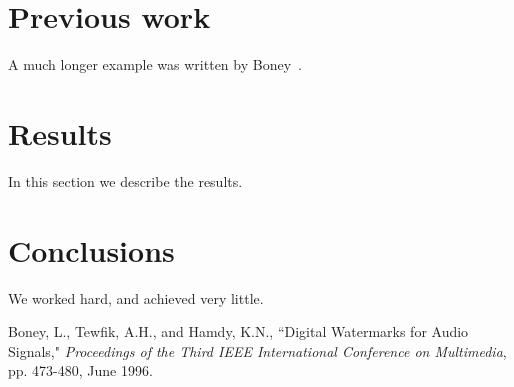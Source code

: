 \documentclass[11pt]{article}
\begin{document}
\section{Previous work}\label{previous work}
A much longer \LaTeXe{} example was written by Boney~\cite{Boney96}.

\section{Results}\label{results}
In this section we describe the results.

\section{Conclusions}\label{conclusions}
We worked hard, and achieved very little.

\begin{thebibliography}{100}

 Boney, L., Tewfik, A.H., and Hamdy, K.N., ``Digital
Watermarks for Audio Signals," \emph{Proceedings of the Third IEEE
International Conference on Multimedia}, pp. 473-480, June 1996.

\end{thebibliography}
\end{document}
